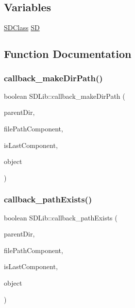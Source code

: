 \subsection*{Variables}
\begin{DoxyCompactItemize}
\item 
\hyperlink{class_s_d_lib_1_1_s_d_class}{S\+D\+Class} \hyperlink{namespace_s_d_lib_a311ba8ede71ad9e1775f79a8f07a3728}{SD}
\end{DoxyCompactItemize}


\subsection{Function Documentation}
\mbox{\label{namespace_s_d_lib_a415aeca91de622c5cfa94b4061cd171f}} 
\subsubsection{\texorpdfstring{callback\+\_\+make\+Dir\+Path()}{callback\_makeDirPath()}}
{\footnotesize\ttfamily boolean S\+D\+Lib\+::callback\+\_\+make\+Dir\+Path (\begin{DoxyParamCaption}\item[{\hyperlink{class_sd_file}{Sd\+File} \&}]{parent\+Dir,  }\item[{const char $\ast$}]{file\+Path\+Component,  }\item[{boolean}]{is\+Last\+Component,  }\item[{void $\ast$}]{object }\end{DoxyParamCaption})}

\mbox{\label{namespace_s_d_lib_ae3054a78e49dbc86c7a165cb88c9a3d5}} 
\subsubsection{\texorpdfstring{callback\+\_\+path\+Exists()}{callback\_pathExists()}}
{\footnotesize\ttfamily boolean S\+D\+Lib\+::callback\+\_\+path\+Exists (\begin{DoxyParamCaption}\item[{\hyperlink{class_sd_file}{Sd\+File} \&}]{parent\+Dir,  }\item[{const char $\ast$}]{file\+Path\+Component,  }\item[{boolean}]{is\+Last\+Component,  }\item[{void $\ast$}]{object }\end{DoxyParamCaption})}

